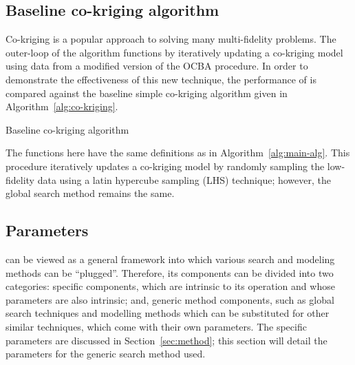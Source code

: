 \documentclass[journal]{IEEEtran}
\begin{document}

\subsection{Baseline co-kriging algorithm}
Co-kriging is a popular approach to solving many multi-fidelity problems. The outer-loop of the \AlgName{} algorithm functions by iteratively updating a co-kriging model using data from a modified version of the OCBA procedure. In order to demonstrate the effectiveness of this new technique, the performance of \AlgName{} is compared against the baseline simple co-kriging algorithm given in Algorithm~\ref{alg:co-kriging}.

\begin{algorithm}[h!] 
\caption{Baseline co-kriging algorithm}
\label{alg:co-kriging}
{\footnotesize
\begin{algorithmic}[1]
 
  
   
     
  \ENDIF
   
   
   
   
   
\ENDWHILE
\end{algorithmic}
}
\end{algorithm}

The functions here have the same definitions as in Algorithm~\ref{alg:main-alg}. This procedure iteratively updates a co-kriging model by randomly sampling the low-fidelity data using a latin hypercube sampling (LHS) technique; however, the global search method remains the same.

\subsection{Parameters}
\AlgName{} can be viewed as a general framework into which various search and modeling methods can be ``plugged''. Therefore, its components can be divided into two categories: \AlgName{} specific components, which are intrinsic to its operation and whose parameters are also intrinsic; and, generic method components, such as global search techniques and modelling methods which can be substituted for other similar techniques, which come with their own parameters. The \AlgName{} specific parameters are discussed in Section~\ref{sec:method}; this section will detail the parameters for the generic search method used.
\end{document}
